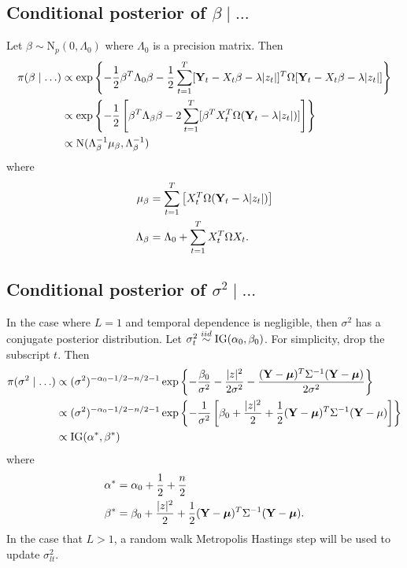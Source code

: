 \documentclass[11pt]{article}
\begin{document}
\subsection*{Conditional posterior of $\beta \mid \ldots$}\label{s:betapost}
Let $\beta \sim \mbox{N}_{p}(0, \Lambda_0)$ where $\Lambda_0$ is a precision matrix. Then
\begin{align*}
    \pi(\beta \mid \ldots) & \propto \exp \left\{ - \frac{ 1 }{ 2 } \beta^T \Lambda_0 \beta - \frac{ 1 }{ 2 } \sum_{t = 1 }^T [\mbox{\bf Y}_t - X_t \beta - \lambda |z_t|]^T \Omega [\mbox{\bf Y}_t - X_t \beta - \lambda |z_t|] \right\}\\
     & \propto \exp \left\{ -\frac{ 1 }{ 2 } \left[ \beta^T \Lambda_\beta \beta  - 2 \sum_{ t = 1 }^T [ \beta^T X_t^T \Omega (\mbox{\bf Y}_t - \lambda |z_t| )] \right] \right\}\\
     & \propto \mbox{N} ( \Lambda_\beta^{-1} \mu_\beta , \Lambda_\beta^{-1})
\end{align*}
where
\begin{align*}
    \mu_\beta &= \sum_{t=1}^{T} \left[ X_t^T \Omega (\mbox{\bf Y}_t - \lambda |z_t|) \right]\\
    \Lambda_\beta &= \Lambda_0 + \sum_{ t = 1 }^{ T} X_t^T \Omega X_t.
\end{align*}

\subsection*{Conditional posterior of $\sigma^2 \mid \ldots$}\label{s:sigpost}
In the case where $L = 1$ and temporal dependence is negligible, then $\sigma^2$ has a conjugate posterior distribution.
Let $\sigma_t^2 \stackrel{iid}{\sim} \mbox{IG}(\alpha_0, \beta_0)$. For simplicity, drop the subscript $t$. Then
\begin{align*}
    \pi(\sigma^2 \mid \ldots) & \propto (\sigma^2)^{ -\alpha_0 - 1 / 2 - n / 2 - 1} \exp \left\{ -\frac{\beta_0}{\sigma^2} - \frac{ |z|^2 }{2 \sigma^2} - \frac{ (\mbox{\bf Y} - \mbox{\boldmath $\mu$})^T \Sigma^{-1} (\mbox{\bf Y} - \mbox{\boldmath $\mu$}) }{2 \sigma^2} \right\} \\
    & \propto (\sigma^2)^{ -\alpha_0 - 1 / 2 - n / 2 - 1} \exp \left\{ - \frac{ 1 }{ \sigma^2 } \left[\beta_0 + \frac{ |z|^2 }{ 2 } + \frac{ 1 }{ 2 } (\mbox{\bf Y} - \mbox{\boldmath $\mu$})^T \Sigma^{-1} (\mbox{\bf Y} - \mu) \right] \right\} \\
    & \propto \mbox{IG} (\alpha^*, \beta^*)
\end{align*}
where
\begin{align*}
    \alpha^* &= \alpha_0 + \frac{1}{2} + \frac{n}{2} \\
    \beta^* &= \beta_0 + \frac{ |z|^2 }{ 2 } + \frac{ 1 }{ 2 }(\mbox{\bf Y} - \mbox{\boldmath $\mu$})^T \Sigma^{-1} (\mbox{\bf Y} - \mbox{\boldmath $\mu$}).
\end{align*}
In the case that $L > 1$, a random walk Metropolis Hastings step will be used to update $\sigma^2_{lt}$.
\end{document}
